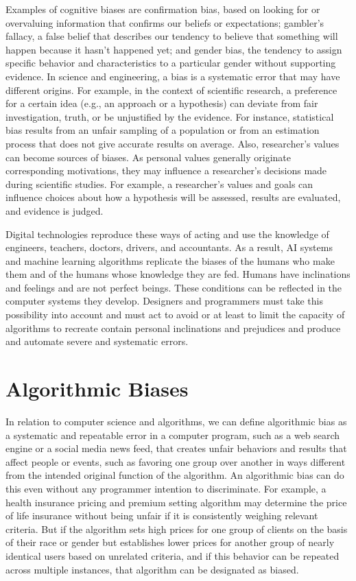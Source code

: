 Examples of cognitive biases are confirmation bias, based on looking for or overvaluing information that confirms our beliefs or expectations; gambler's \hbox{fallacy,} a false belief that describes our tendency to believe that something will happen because it hasn't happened yet; and gender bias, the tendency to assign specific behavior and characteristics to a particular gender without supporting evidence. In science and engineering, a bias is a systematic error that may have different origins. For example, in the context of scientific research, a preference for a certain idea (e.g., an approach or a hypothesis) can deviate from fair investigation, truth, or be unjustified by the evidence. For instance, statistical bias results from an unfair sampling of a population or from an estimation process that does not give accurate results on average. Also, researcher's values can become sources of biases. As personal values generally originate corresponding motivations, they may influence a researcher's decisions made during scientific studies. For example, a researcher's values and goals can influence choices about how a hypothesis will be assessed, results are evaluated, and evidence is judged.

Digital technologies reproduce these ways of acting and use the knowledge of engineers, teachers, doctors, drivers, and accountants. As a result, AI systems and machine learning algorithms replicate the biases of the humans who make them and of the humans whose knowledge they are fed. Humans have inclinations and feelings and are not perfect beings. These conditions can be reflected in the computer systems they develop. Designers and programmers must take this possibility into account and must act to avoid or at least to limit the capacity of algorithms to recreate contain personal inclinations and prejudices and produce and automate severe and systematic errors.

\section{\label{sec:7.3}Algorithmic Biases}

In relation to computer science and algorithms, we can define algorithmic bias as a systematic and repeatable error in a computer program, such as a web search engine or a social media news feed, that creates unfair behaviors and results that affect people or events, such as favoring one group over another in ways different from the intended original function of the algorithm. An algorithmic bias can do this even without any programmer intention to discriminate. For example, a health insurance pricing and premium setting algorithm may determine the price of life insurance without being unfair if it is consistently weighing relevant criteria. But if the algorithm sets high prices for one group of clients on the basis of their race or gender but establishes lower prices for another group of nearly identical users based on unrelated criteria, and if this behavior can be repeated across multiple instances, that algorithm can be designated as biased.

